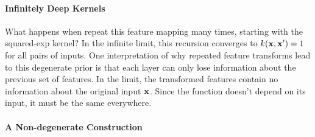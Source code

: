 \documentclass[twoside]{article}
\begin{document}
\paragraph{Infinitely Deep Kernels}
What happens when repeat this feature mapping many times, starting with the squared-exp kernel?  In the infinite limit, this recursion converges to $k({\bf{x}},{\bf{x}}') = 1$ for all pairs of inputs.  
%
One interpretation of why repeated feature transforms lead to this degenerate prior is that each layer can only lose information about the previous set of features.  
In the limit, the transformed features contain no information about the original input ${\bf{x}}$.  Since the function doesn't depend on its input, it must be the same everywhere.

\paragraph{A Non-degenerate Construction}
\end{document}
